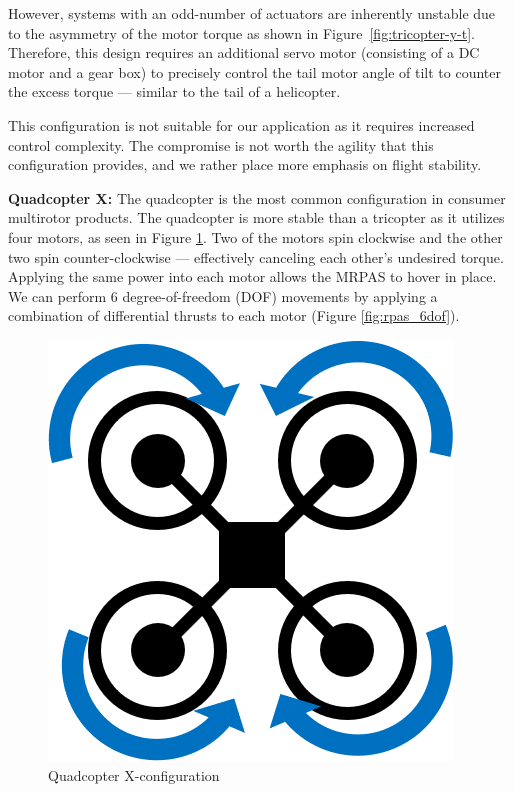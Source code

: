 However, systems with an odd-number of actuators are inherently unstable due to the asymmetry of the motor torque as shown in Figure~\ref{fig:tricopter-y-t}. Therefore, this design requires an additional servo motor (consisting of a DC motor and a gear box) to precisely control the tail motor angle of tilt to counter the excess torque --- similar to the tail of a helicopter.

This configuration is not suitable for our application as it requires increased control complexity. The compromise is not worth the agility that this configuration provides, and we rather place more emphasis on flight stability.

\textbf{Quadcopter X:}
The quadcopter is the most common configuration in consumer multirotor products. The quadcopter is more stable than a tricopter as it utilizes four motors, as seen in Figure \ref{fig:quadcopter-x-t}. Two of the motors spin clockwise and the other two spin counter-clockwise --- effectively canceling each other's undesired torque. Applying the same power into each motor allows the MRPAS to hover in place. We can perform 6 degree-of-freedom (DOF) movements by applying a combination of differential thrusts to each motor (Figure \ref{fig:rpas_6dof}).

\begin{figure}[h]
    \centering
    \includegraphics[scale=0.4]{img/drone_xconfigt}
    \caption{Quadcopter X-configuration}
    \label{fig:quadcopter-x-t}
\end{figure}

